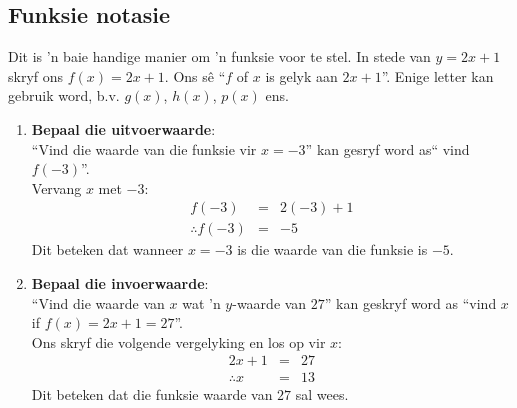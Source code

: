 \subsection*{Funksie notasie}
Dit is 'n baie handige manier om 'n funksie voor te stel. In stede van $y=2x+1$ skryf ons $f(x) = 2x+1$. Ons s\^e  ``$f$ of $x$ is gelyk aan $2x+1$''. Enige letter kan gebruik word, b.v. $g(x)$, $h(x)$, $p(x)$ ens. 
\begin{enumerate}[noitemsep, label=\textbf{\arabic*}. ] 
 \item \textbf{Bepaal die uitvoerwaarde}: \\
``Vind die waarde van die funksie vir $x=-3$'' kan gesryf word as`` vind $f(-3)$''.
\\Vervang $x$ met $-3$:
\begin{eqnarray*}
  f(-3) & = & 2(-3)+1 \\
  \therefore f(-3) & = & -5
\end{eqnarray*}
Dit beteken dat wanneer $x=-3$ is die waarde van die funksie is $-5$.\\
\item \textbf{Bepaal die invoerwaarde}: \\
``Vind die waarde van $x$ wat 'n $y$-waarde van $27$'' kan geskryf word as ``vind $x$ if $f(x)=2x+1 = 27$''. \\
Ons skryf die volgende vergelyking en los op vir $x$: \\
\begin{eqnarray*}
  2x+1 &=& 27 \\
  \therefore x &=& 13
\end{eqnarray*}
Dit beteken dat die funksie waarde van $27$ sal wees.

\end{enumerate}

